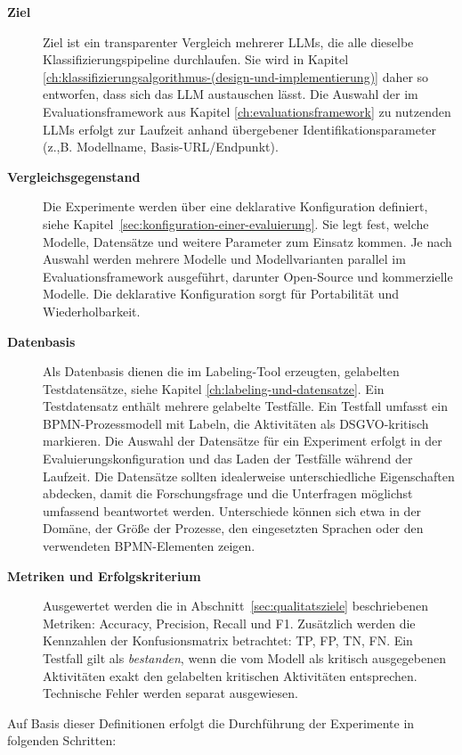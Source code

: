 \begin{description}
    \item[\textbf{Ziel}] Ziel ist ein transparenter Vergleich mehrerer \acp{LLM}, die alle dieselbe Klassifizierungspipeline durchlaufen. Sie wird in Kapitel \ref{ch:klassifizierungsalgorithmus-(design-und-implementierung)} daher so entworfen, dass sich das \ac{LLM} austauschen lässt. Die Auswahl der im Evaluationsframework aus Kapitel \ref{ch:evaluationsframework} zu nutzenden \acp{LLM} erfolgt zur Laufzeit anhand übergebener Identifikationsparameter (z.,B. Modellname, Basis-URL/Endpunkt).
    \item[\textbf{Vergleichsgegenstand}] Die Experimente werden über eine deklarative Konfiguration definiert, siehe Kapitel~\ref{sec:konfiguration-einer-evaluierung}. Sie legt fest, welche Modelle, Datensätze und weitere Parameter zum Einsatz kommen. Je nach Auswahl werden mehrere Modelle und Modellvarianten parallel im Evaluationsframework ausgeführt, darunter Open-Source und kommerzielle Modelle. Die deklarative Konfiguration sorgt für Portabilität und Wiederholbarkeit.
    \item[\textbf{Datenbasis}] Als Datenbasis dienen die im Labeling-Tool erzeugten, gelabelten Testdatensätze, siehe Kapitel \ref{ch:labeling-und-datensatze}. Ein Testdatensatz enthält mehrere gelabelte Testfälle. Ein Testfall umfasst ein \ac{BPMN}-Prozessmodell mit Labeln, die Aktivitäten als \ac{DSGVO}-kritisch markieren. Die Auswahl der Datensätze für ein Experiment erfolgt in der Evaluierungskonfiguration und das Laden der Testfälle während der Laufzeit. Die Datensätze sollten idealerweise unterschiedliche Eigenschaften abdecken, damit die Forschungsfrage und die Unterfragen möglichst umfassend beantwortet werden. Unterschiede können sich etwa in der Domäne, der Größe der Prozesse, den eingesetzten Sprachen oder den verwendeten \ac{BPMN}-Elementen zeigen.
    \item[\textbf{Metriken und Erfolgskriterium}] Ausgewertet werden die in Abschnitt~\ref{sec:qualitatsziele} beschriebenen Metriken: Accuracy, Precision, Recall und F1. Zusätzlich werden die Kennzahlen der Konfusionsmatrix betrachtet: \ac{TP}, \ac{FP}, \ac{TN}, \ac{FN}. Ein Testfall gilt als \emph{bestanden}, wenn die vom Modell als kritisch ausgegebenen Aktivitäten exakt den gelabelten kritischen Aktivitäten entsprechen. Technische Fehler werden separat ausgewiesen.
\end{description}

Auf Basis dieser Definitionen erfolgt die Durchführung der Experimente in folgenden Schritten:

